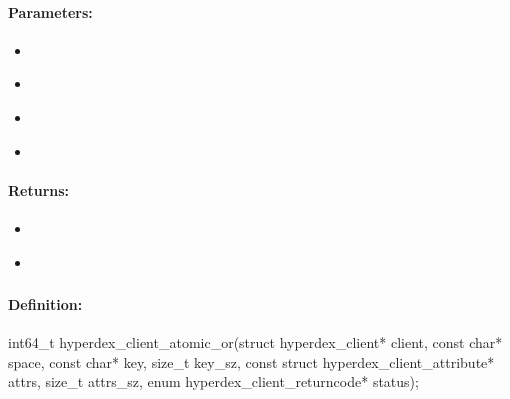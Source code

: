 \paragraph{Parameters:}
\begin{itemize}[noitemsep]
\item {}\\

\item {}\\

\item {}\\

\item {}\\

\end{itemize}

\paragraph{Returns:}
\begin{itemize}[noitemsep]
\item {}\\

\item {}\\

\end{itemize}

\pagebreak
\subsubsection{}
\label{api:c:atomic_or}


\paragraph{Definition:}
\begin{ccode}
int64_t hyperdex_client_atomic_or(struct hyperdex_client* client,
        const char* space,
        const char* key, size_t key_sz,
        const struct hyperdex_client_attribute* attrs, size_t attrs_sz,
        enum hyperdex_client_returncode* status);
\end{ccode}

